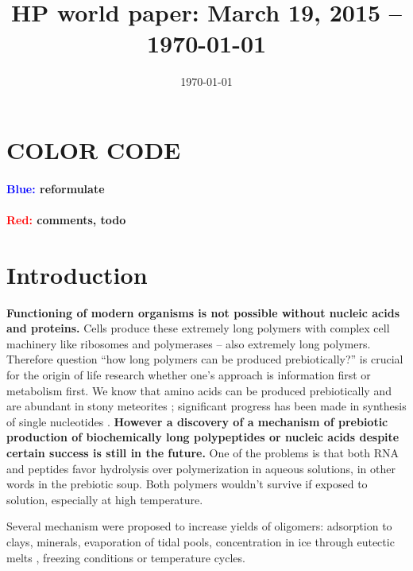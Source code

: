\documentclass[12pt]{paper}
\title{HP world paper: March 19, 2015 -- \today}
\author{}
\date{\today}
\newcommand{\red}[1]{\textcolor{red}{#1}}
\begin{document}
 \maketitle
 \tableofcontents
 
 \section*{COLOR CODE}
\paragraph{\textcolor{blue}{Blue: } reformulate}
\paragraph{\red{Red: }comments, todo}

 
 
\section{Introduction} 

\textbf{Functioning of modern organisms is not possible without nucleic 
acids and proteins.} Cells produce these extremely long polymers with complex cell machinery 
like ribosomes and polymerases -- also extremely long polymers. 
Therefore question ``how long polymers can be produced prebiotically?'' is crucial for the origin 
of life research whether one's approach is information first or metabolism first.
We know that amino acids can be produced prebiotically \cite{Miller1953} and are abundant in 
stony meteorites \cite{Sephton2002}; significant progress has been made in synthesis of 
single nucleotides \cite{Powner2009a}. \textbf{However a discovery of a mechanism of prebiotic 
production of biochemically long polypeptides or nucleic acids despite certain success 
\cite{Shock1992,Martin1998,PAECHT-HOROWITZ1970,Lambert2008,Leman2004a,Orgel2004,Ferris1996} is 
still in the future.} One of the problems is that both RNA and peptides favor hydrolysis  over 
polymerization in aqueous solutions, in other words in the prebiotic soup. Both polymers wouldn't 
survive if exposed to solution, especially at high temperature\cite{Pace1991}.

Several mechanism were proposed to increase yields of oligomers: adsorption to 
clays\cite{Rao1980,Lambert2008}, minerals\cite{Bernal1949,Ferris1996}, evaporation of tidal 
pools\cite{Nelson2001}, concentration in ice through eutectic melts \cite{Kanavarioti2001}, 
freezing conditions\cite{Bada2004} or temperature cycles. 
\end{document}
